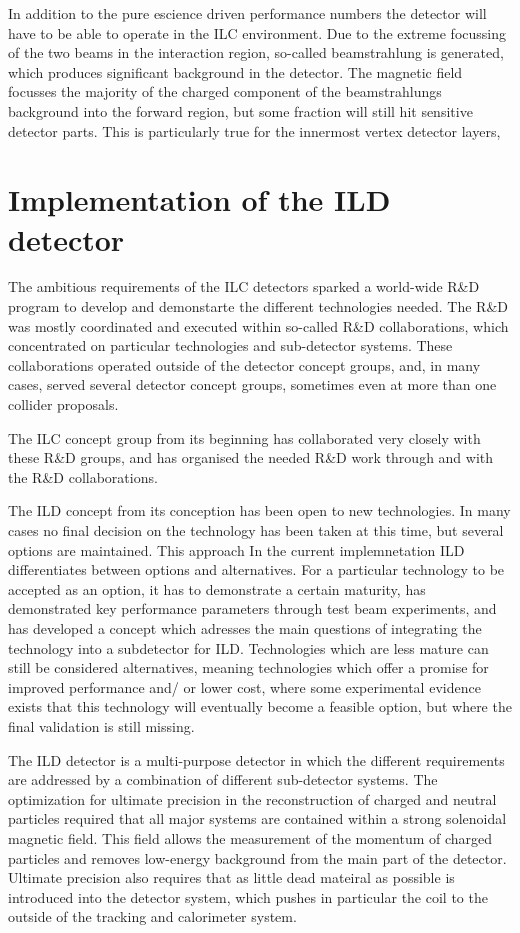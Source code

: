 \documentclass[%
 preprint,
 amsmath,amssymb,
 aps,
]{revtex4-1}
\begin{document}
In addition to the pure escience driven performance numbers the detector will have to be able to operate in the ILC environment. Due to the extreme focussing of the two beams in the interaction region, so-called beamstrahlung is generated, which produces significant background in the detector. The magnetic field focusses the majority of the charged component of the beamstrahlungs background into the forward region, but some fraction will still hit sensitive detector parts. This is particularly true for the innermost vertex detector layers, 


\section{Implementation of the ILD detector}
The ambitious requirements of the ILC detectors sparked a world-wide R\&D program to develop and demonstarte the different technologies needed. The R\&D was mostly coordinated and executed within so-called R\&D collaborations, which concentrated on particular technologies and sub-detector systems. These collaborations operated outside of the detector concept groups, and, in many cases, served several detector concept groups, sometimes even at more than one collider proposals. 

The ILC concept group from its beginning has collaborated very closely with these R\&D groups, and has organised the needed R\&D work through and with the R\&D collaborations. 

The ILD concept from its conception has been open to new technologies. In many cases no final decision on the technology has been taken at this time, but several options are maintained. This approach In the current implemnetation ILD differentiates between options and alternatives. For a particular technology to be accepted as an option, it has to demonstrate a certain maturity, has demonstrated key performance parameters through test beam experiments, and has developed a concept which adresses the main questions of integrating the technology into a subdetector for ILD. Technologies which are less mature can still be considered alternatives, meaning technologies which offer a promise for improved performance and/ or lower cost, where some experimental evidence exists that this technology will eventually become a feasible option, but where the final validation is still missing. 

The ILD detector is a multi-purpose detector in which the different requirements are addressed by a combination of different sub-detector systems. The optimization for ultimate precision in the reconstruction of charged and neutral particles required that all major systems are contained within a strong solenoidal magnetic field. This field allows the measurement of the momentum of charged particles and removes low-energy background from the main part of the detector. Ultimate precision also requires that as little dead mateiral as possible is introduced into the detector system, which pushes in particular the coil to the outside of the tracking and calorimeter system. 
\end{document}
